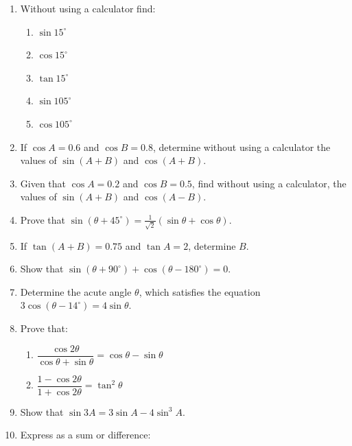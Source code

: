 \documentclass[
  12pt,
  oneside]{book}
\providecommand{\tightlist}{%
  \setlength{\itemsep}{0pt}\setlength{\parskip}{0pt}}
\theoremstyle{definition}
\theoremstyle{definition}
\theoremstyle{definition}
\theoremstyle{definition}
\theoremstyle{remark}
\begin{document}
\begin{enumerate}
\def\labelenumi{\arabic{enumi}.}
\item
  Without using a calculator find:

  \begin{enumerate}
  \def\labelenumii{\roman{enumii})}
  \tightlist
  \item
    \(\sin 15^\circ\)
  \item
    \(\cos 15^\circ\)
  \item
    \(\tan 15^\circ\)
  \item
    \(\sin 105^\circ\)
  \item
    \(\cos 105^\circ\)
  \end{enumerate}
\item
  If \(\cos A = 0.6\) and \(\cos B = 0.8\), determine without using a calculator the values of \(\sin (A + B)\) and \(\cos(A + B)\).
\item
  Given that \(\cos A = 0.2\) and \(\cos B = 0.5\), find without using a calculator, the values of
  \(\sin (A + B)\) and \(\cos (A - B)\).
\item
  Prove that \(\sin(\theta+45^\circ)=\frac{1}{\sqrt{2}}(\sin\theta+\cos\theta)\).
\item
  If \(\tan(A+B)=0.75\) and \(\tan A=2\), determine \(B\).
\item
  Show that \(\sin (\theta + 90^\circ) + \cos (\theta - 180^\circ) = 0\).
\item
  Determine the acute angle \(\theta\), which satisfies the equation \(3 \cos (\theta - 14^\circ) = 4 \sin \theta\).
\item
  Prove that:

  \begin{enumerate}
  \def\labelenumii{\roman{enumii})}
  \tightlist
  \item
    \(\dfrac{\cos2\theta}{\cos\theta+\sin\theta}=\cos\theta-\sin\theta\)
  \item
    \(\dfrac{1-\cos2\theta}{1+\cos2\theta}=\tan^2\theta\)
  \end{enumerate}
\item
  Show that \(\sin 3A = 3\sin A - 4\sin^3 A\).
\item
  Express as a sum or difference:


\end{enumerate}
\end{document}
